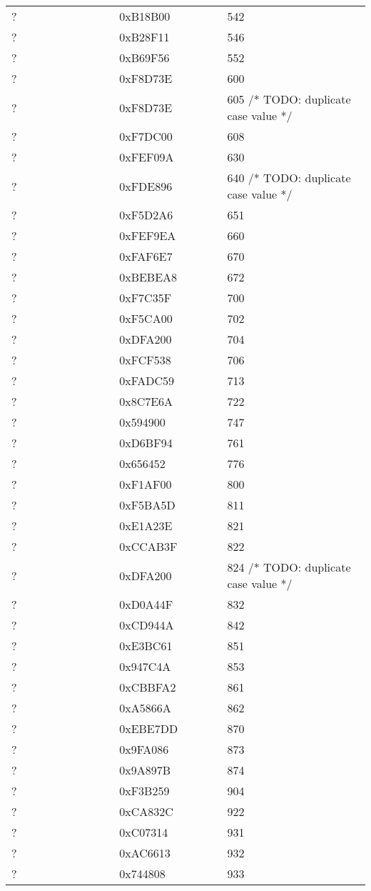 \begin{longtable}{p{0.3\linewidth} p{0.3\linewidth} p{0.4\linewidth}}
? &  0xB18B00 &  542\\
? &  0xB28F11 &  546\\
? &  0xB69F56 &  552\\
? &  0xF8D73E &  600\\
? &  0xF8D73E &  605   /* TODO: duplicate case value */\\
? &  0xF7DC00 &  608\\
? &  0xFEF09A &  630\\
? &  0xFDE896 &  640   /*  TODO: duplicate case value */\\
? &  0xF5D2A6 &  651\\
? &  0xFEF9EA &  660\\
? &  0xFAF6E7 &  670\\
? &  0xBEBEA8 &  672\\
? &  0xF7C35F &  700\\
? &  0xF5CA00 &  702\\
? &  0xDFA200 &  704\\
? &  0xFCF538 &  706\\
? &  0xFADC59 &  713\\
? &  0x8C7E6A &  722\\
? &  0x594900 &  747\\
? &  0xD6BF94 &  761\\
? &  0x656452 &  776\\
? &  0xF1AF00 &  800\\
? &  0xF5BA5D &  811\\
? &  0xE1A23E &  821\\
? &  0xCCAB3F &  822\\
? &  0xDFA200 &  824 /* TODO: duplicate case value */\\
? &  0xD0A44F &  832\\
? &  0xCD944A &  842\\
? &  0xE3BC61 &  851\\
? &  0x947C4A &  853\\
? &  0xCBBFA2 &  861\\
? &  0xA5866A &  862\\
? &  0xEBE7DD &  870\\
? &  0x9FA086 &  873\\
? &  0x9A897B &  874\\
? &  0xF3B259 &  904\\
? &  0xCA832C &  922\\
? &  0xC07314 &  931\\
? &  0xAC6613 &  932\\
? &  0x744808 &  933\\

\end{longtable}
